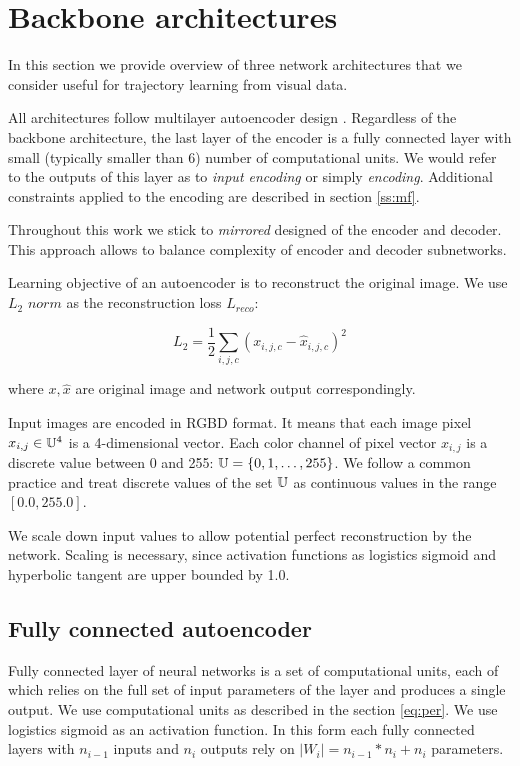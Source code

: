 \section{Backbone architectures}

In this section we provide overview of three network architectures that we consider useful for trajectory learning from visual data.

All architectures follow multilayer autoencoder design \cite{Hinton2006}.
Regardless of the backbone architecture, the last layer of the encoder is a fully connected layer with small (typically smaller than 6) number of computational units.
We would refer to the outputs of this layer as to  \textit{input encoding} or simply \textit{encoding}.
Additional constraints applied to the encoding are described in section \ref{ss:mf}.

Throughout this work we stick to \textit{mirrored} designed of the encoder and decoder.
This approach allows to balance complexity of encoder and decoder subnetworks.

Learning objective of an autoencoder is to reconstruct the original image.
We use $L_2$ $norm$ as the reconstruction loss $L_{reco}$:

\begin{equation}
  L_{2} = \frac{1}{2} \sum_{i, j, c} (x_{i,j,c} - \hat{x}_{i,j,c})^2
\end{equation}

where $x, \hat{x}$ are original image and network output correspondingly.

Input images are encoded in RGBD format. It means that each image pixel $x_{i,j} \in \Bbb{U}^4$ is a 4-dimensional vector.
Each color channel of pixel vector $x_{i,j}$ is a discrete value between 0 and 255: $\Bbb{U} = \{0, 1, \ldots, 255 \}$.
We follow a common practice and treat discrete values of the set $\Bbb{U}$ as continuous values in the range $[0.0, 255.0]$.

We scale down input values to allow potential perfect reconstruction by the network.
Scaling is necessary, since activation functions as logistics sigmoid and hyperbolic tangent are upper bounded by 1.0.


\subsection{Fully connected autoencoder}

Fully connected layer of neural networks is a set of computational units, each of which relies on the full set of input parameters of the layer and produces a single output.
We use computational units as described in the section \ref{eq:per}.
We use logistics sigmoid as an activation function.
In this form each fully connected layers with $n_{i-1}$ inputs and $n_i$ outputs rely on $|W_i|=n_{i-1}*n_i+n_i$ parameters.

